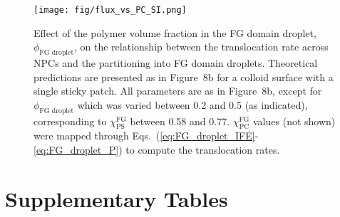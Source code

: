 \documentclass[10pt, a4paper, twocolumn]{article}
\newcommand{\todo}[1]{\pdfcomment{#1}} %
\begin{document}
\begin{figure}[]
    \centering
    \texttt{[image: fig/flux\_vs\_PC\_SI.png]}
    \caption{
    Effect of the polymer volume fraction in the FG domain droplet, $\phi_\text{FG droplet}$, on the relationship between the translocation rate across NPCs and the partitioning into FG domain droplets. 
    Theoretical predictions are presented as in Figure~8b for a colloid surface with a single sticky patch.
    All parameters are as in Figure~8b, except for $\phi_\text{FG droplet}$ which was varied between 0.2 and 0.5 (as indicated), corresponding to $\chi_{\text{PS}}^{\text{FG}}$ between 0.58 and 0.77.
    $\chi_\text{PC}^\text{FG}$ values (not shown) were mapped through Eqs.~(\ref{eq:FG_droplet_IFE}-\ref{eq:FG_droplet_P}) to compute the translocation rates.
    }
    \label{fig:flux_vs_PC}
\end{figure}


\pagebreak
\onecolumn
\section*{Supplementary Tables}
\end{document}
